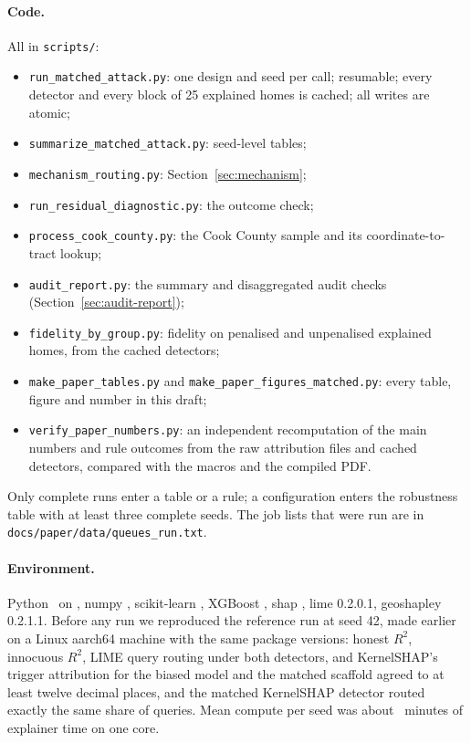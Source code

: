 \paragraph{Code.} All in \texttt{scripts/}:
\begin{itemize}
  \item \texttt{run\_matched\_attack.py}: one design and seed per call; resumable; every detector and every block of
        25 explained homes is cached; all writes are atomic;
  \item \texttt{summarize\_matched\_attack.py}: seed-level tables;
  \item \texttt{mechanism\_routing.py}: Section~\ref{sec:mechanism};
  \item \texttt{run\_residual\_diagnostic.py}: the outcome check;
  \item \texttt{process\_cook\_county.py}: the Cook County sample and its coordinate-to-tract lookup;
  \item \texttt{audit\_report.py}: the summary and disaggregated audit checks (Section~\ref{sec:audit-report});
  \item \texttt{fidelity\_by\_group.py}: fidelity on penalised and unpenalised explained homes, from the cached
        detectors;
  \item \texttt{make\_paper\_tables.py} and \texttt{make\_paper\_figures\_matched.py}: every table, figure and
        number in this draft;
  \item \texttt{verify\_paper\_numbers.py}: an independent recomputation of the main numbers and rule outcomes from
        the raw attribution files and cached detectors, compared with the macros and the compiled PDF.
\end{itemize}
Only complete runs enter a table or a rule; a configuration enters the robustness table with at least three complete
seeds.
The job lists that were run are in \texttt{docs/paper/data/queues\_run.txt}.

\paragraph{Environment.} Python \VerPython\ on \VerMachine, numpy \VerNumpy, scikit-learn \VerSklearn, XGBoost
\VerXgb, shap \VerShap, lime 0.2.0.1, geoshapley 0.2.1.1. Before any run we reproduced the reference run at seed 42,
made earlier on a Linux aarch64 machine with the same package versions: honest $R^2$, innocuous $R^2$, LIME query
routing under both detectors, and KernelSHAP's trigger attribution for the biased model and the matched scaffold
agreed to at least twelve decimal places, and the matched KernelSHAP detector routed exactly the same share of
queries. Mean compute per seed was about \MinutesPerSeed\ minutes of explainer time on one core.

